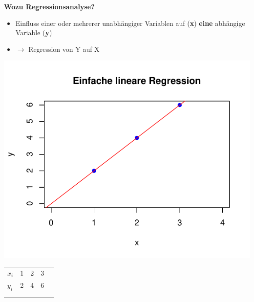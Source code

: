 \documentclass[aspectratio=169, journal, x11names, unknownkeysallowed, hyperref={colorlinks,
linkcolor = SS2,
urlcolor  = F3,
citecolor = F3,
anchorcolor = A4}, 12pt]{beamer}
\newcommand{\oarrow}{\textcolor{A1}{$\rightarrow$} }
\begin{document}
    \begin{frame}[t]
      \textbf{Wozu Regressionsanalyse?}
      \begin{minipage}[t]{0.45\textwidth}
        \vspace{-11.5em}
        \begin{itemize}
            \item Einfluss einer oder mehrerer unabhängiger Variablen auf (\textbf{x}) \linebreak \textbf{eine} abhängige Variable (\textbf{y})\item[] \oarrow Regression von Y auf X
        \end{itemize}
      \end{minipage}%
      \begin{minipage}[t]{0.45\textwidth}
        \centering
        \includegraphics[scale=0.5]{../Plots/reg_lin_1.pdf}
        \begin{table}[]
          \begin{tabular}{lllll}
          \multicolumn{1}{l|}{\textbf{$x_i$}} & 1 & 2 & 3 &  \\ \cline{1-4}
          \multicolumn{1}{l|}{$y_i$} & 2 & 4 & 6 &  \\
                                 &   &   &   &  \\
                                 &   &   &   & 
          \end{tabular}
          \end{table}
      \end{minipage}
    \end{frame}
\end{document}
